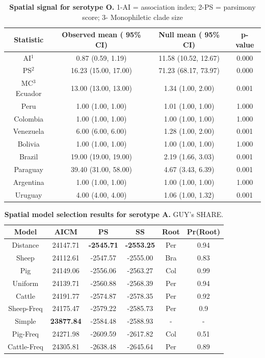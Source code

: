 \documentclass[10pt]{article}
\begin{document}
\begin{table}[!ht]
\caption{
\textbf{Spatial signal for serotype O. } 1-AI = association index; 2-PS = parsimony score; 3- Monophiletic clade size}
\begin{tabular}{cccc}
\toprule
Statistic &	Observed mean ( 95\% CI)&	Null mean ( 95\% CI)&	p-value\\
\midrule
AI$^1$ &	0.87 (0.59, 1.19)&	11.58 (10.52, 12.67)&	0.000\\
PS$^2$ &	16.23 (15.00, 17.00)&	71.23 (68.17, 73.97)&	0.000\\
MC$^3$ Ecuador& 13.00 (13.00, 13.00)&	1.34 (1.00, 2.00)&	0.001\\
Peru&	1.00 (1.00, 1.00)&	1.01 (1.00, 1.00)&	1.000\\
Colombia&	1.00 (1.00, 1.00)&	1.00 (1.00, 1.00)&	1.000\\
Venezuela&	6.00 (6.00, 6.00)&	1.28 (1.00, 2.00)&	0.001\\
Bolivia &	1.00 (1.00, 1.00)&	1.00 (1.00, 1.00)&	1.000\\
Brazil&	19.00 (19.00, 19.00)&	2.19 (1.66, 3.03)&	0.001\\
Paraguay&	39.40 (31.00, 58.00)&	4.67 (3.43, 6.39)&	0.001\\
Argentina&	1.00 (1.00, 1.00)&	1.00 (1.00, 1.00)&	1.000\\
Uruguay&	4.00 (4.00, 4.00)&	1.06 (1.00, 1.32)&	0.001\\
\bottomrule
\end{tabular}
\begin{flushleft}
\end{flushleft}
\label{tab:BaTSO}
 \end{table}
\begin{table}[!ht]
\caption{
\textbf{Spatial model selection results for serotype A. } GUY's SHARE.}
\begin{tabular}{cccccc}
\toprule
Model & AICM  & PS    & SS    & Root  & Pr(Root)\\
\midrule
    \hline
    Distance & 24147.71 & \textbf{-2545.71} & \textbf{-2553.25} & Per   & 0.94 \\
    Sheep & 24112.61 & -2547.57 & -2555.00 & Bra   & 0.83 \\
    Pig & 24149.06 & -2556.06 & -2563.27 & Col   & 0.99 \\
    Uniform & 24139.71 & -2560.88 & -2568.39 & Per   & 0.94 \\
    Cattle & 24191.77 & -2574.87 & -2578.35 & Per   & 0.92 \\
    Sheep-Freq & 24175.47 & -2579.22 & -2585.73 & Per   & 0.9 \\
    Simple & \textbf{23877.84} & -2584.48 & -2588.93 & -     & - \\
    Pig-Freq & 24271.98 & -2609.59 & -2617.82 & Col   & 0.51 \\
    Cattle-Freq & 24305.81 & -2638.48 & -2645.64 & Per   & 0.89 \\
\bottomrule
\end{tabular}
\begin{flushleft}
\end{flushleft}
\label{tab:prootA}
 \end{table}
\end{document}
